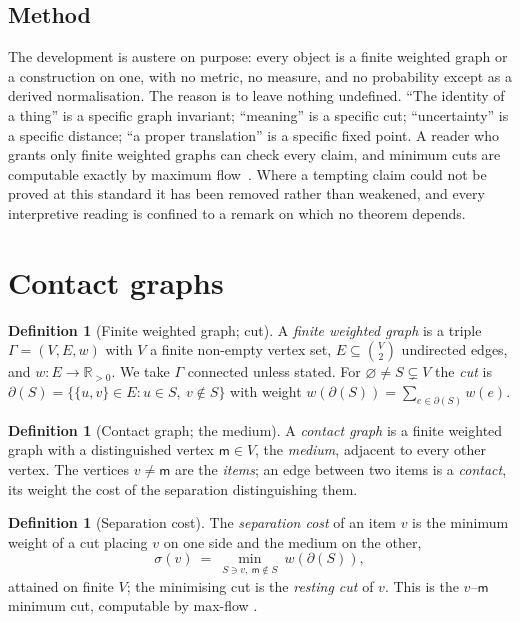 \documentclass[twocolumn,11pt,a4paper]{article}
\theoremstyle{sup}
\theoremstyle{definition}
\newtheorem{definition}[theorem]{Definition}
\theoremstyle{remark}
\newcommand{\R}{\mathbb{R}}
\newcommand{\Gph}{\Gamma}
\newcommand{\V}{V}
\newcommand{\E}{E}
\newcommand{\wt}{w}
\newcommand{\med}{\mathsf{m}}
\newcommand{\cut}{\partial}
\newcommand{\str}{\sigma}
\begin{document}
\subsection{Method}

The development is austere on purpose: every object is a finite weighted graph
or a construction on one, with no metric, no measure, and no probability except
as a derived normalisation. The reason is to leave nothing undefined. ``The
identity of a thing'' is a specific graph invariant; ``meaning'' is a specific
cut; ``uncertainty'' is a specific distance; ``a proper translation'' is a
specific fixed point. A reader who grants only finite weighted graphs can check
every claim, and minimum cuts are computable exactly by maximum
flow~\citep{fordfulkerson1956,menger1927}. Where a tempting claim could not be
proved at this standard it has been removed rather than weakened, and every
interpretive reading is confined to a remark on which no theorem depends.

\section{Contact graphs}
\label{sec:graph}

\begin{definition}[Finite weighted graph; cut]
\label{def:graph}
A \emph{finite weighted graph} is a triple $\Gph=(\V,\E,\wt)$ with $\V$ a finite
non-empty vertex set, $\E\subseteq\binom{\V}{2}$ undirected edges, and
$\wt\colon\E\to\R_{>0}$. We take $\Gph$ connected unless stated. For
$\varnothing\neq S\subsetneq\V$ the \emph{cut} is
$\cut(S)=\{\{u,v\}\in\E:u\in S,\ v\notin S\}$ with weight
$\wt(\cut(S))=\sum_{e\in\cut(S)}\wt(e)$.
\end{definition}

\begin{definition}[Contact graph; the medium]
\label{def:contact}
A \emph{contact graph} is a finite weighted graph with a distinguished vertex
$\med\in\V$, the \emph{medium}, adjacent to every other vertex. The vertices
$v\neq\med$ are the \emph{items}; an edge between two items is a \emph{contact},
its weight the cost of the separation distinguishing them.
\end{definition}

\begin{definition}[Separation cost]
\label{def:sepcost}
The \emph{separation cost} of an item $v$ is the minimum weight of a cut placing
$v$ on one side and the medium on the other,
\[
\str(v)\ =\ \min_{S\ni v,\ \med\notin S}\ \wt(\cut(S)),
\]
attained on finite $\V$; the minimising cut is the \emph{resting cut} of $v$.
This is the $v$--$\med$ minimum cut, computable by max-flow
\citep{fordfulkerson1956,menger1927,diestel2017}.
\end{definition}
\end{document}
